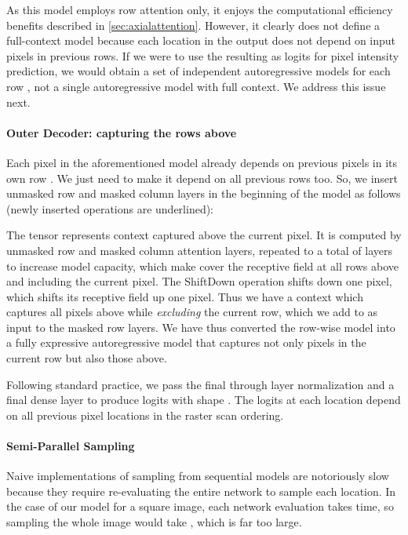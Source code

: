 \documentclass{article} \usepackage{iclr2020_conference,times}
\begin{document}
As this model employs row attention only, it enjoys the computational efficiency benefits described in \cref{sec:axialattention}. However, it clearly does not define a full-context model because each location in the output does not depend on input pixels in previous rows. If we were to use the resulting  as logits for pixel intensity prediction, we would obtain a set of  independent autoregressive models  for each row , not a single autoregressive model with full context.
We address this issue next.


\vspace{-0.5em}
\paragraph{Outer Decoder: capturing the rows above}
\label{sec:fullyexpressivesinglechannel}

Each pixel  in the aforementioned model already depends on previous pixels in its own row . We just need to make it depend on all previous rows  too. So, we insert unmasked row and masked column layers in the beginning of the model as follows (newly inserted operations are underlined):



The tensor  represents context captured above the current pixel. It is computed by unmasked row and masked column attention layers, repeated to a total of  layers to increase model capacity, which make  cover the receptive field at all rows above and including the current pixel. The ShiftDown operation shifts  down one pixel, which shifts its receptive field up one pixel. Thus we have a context which captures all pixels above while \emph{excluding} the current row, which we add to  as input to the masked row layers. We have thus converted the row-wise model into a fully expressive autoregressive model that captures not only pixels in the current row but also those above.

Following standard practice, we pass the final  through layer normalization and a final dense layer to produce logits with shape . The logits at each location depend on all previous pixel locations in the raster scan ordering.


\vspace{-0.5em}
\paragraph{Semi-Parallel Sampling}
\label{sec:sampling}

Naive implementations of sampling from sequential models are notoriously slow because they require re-evaluating the entire network to sample each location. In the case of our model for a  square image, each network evaluation takes  time, so sampling the whole image would take , which is far too large.
\end{document}
